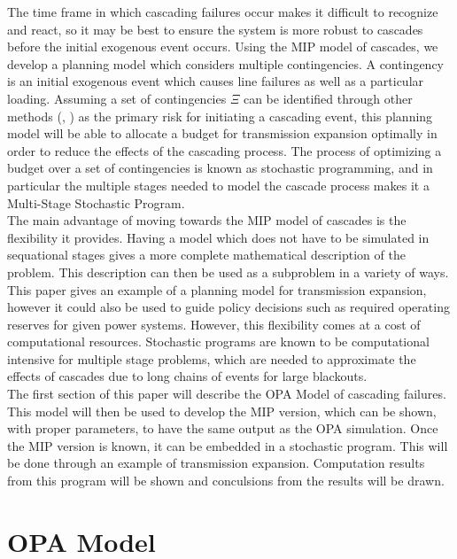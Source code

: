 The time frame in which cascading failures occur makes it difficult to recognize and react, so it may be best to ensure the system is more robust to cascades before the initial exogenous event occurs.  Using the MIP model of cascades, we develop a planning model which considers multiple contingencies.  A contingency is an initial exogenous event which causes line failures as well as a particular loading.  Assuming a set of contingencies $\Xi$ can be identified through other methods (\cite{vul_region}, \cite{cata_failure})  as the primary risk for initiating a cascading event, this planning model will be able to allocate a budget for transmission expansion optimally in order to reduce the effects of the cascading process.  The process of optimizing a budget over a set of contingencies is known as stochastic programming, and in particular the multiple stages needed to model the cascade process makes it a Multi-Stage Stochastic Program. \\

The main advantage of moving towards the MIP model of cascades is the flexibility it provides.  Having a model which does not have to be simulated in sequational stages gives a more complete mathematical description of the problem.  This description can then be used as a subproblem in a variety of ways.  This paper gives an example of a planning model for transmission expansion, however it could also be used to guide policy decisions such as required operating reserves for given power systems.  However, this flexibility comes at a cost of computational resources.  Stochastic programs are known to be computational intensive for multiple stage problems, which are needed to approximate the effects of cascades due to long chains of events for large blackouts.	\\

The first section of this paper will describe the OPA Model of cascading failures.  This model will then be used to develop the MIP version, which can be shown, with proper parameters, to have the same output as the OPA simulation.  Once the MIP version is known, it can be embedded in a stochastic program.  This will be done through an example of transmission expansion.  Computation results from this program will be shown and conculsions from the results will be drawn.   


\section{OPA Model}

